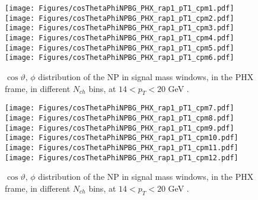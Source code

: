 \documentclass[12pt]{article}
\newcommand{\pt}{$p_{\mathrm{T}}$}
\begin{document}
%
%

\begin{figure}[htbp]
\centering
\texttt{[image: Figures/cosThetaPhiNPBG\_PHX\_rap1\_pT1\_cpm1.pdf]}
\texttt{[image: Figures/cosThetaPhiNPBG\_PHX\_rap1\_pT1\_cpm2.pdf]}
\texttt{[image: Figures/cosThetaPhiNPBG\_PHX\_rap1\_pT1\_cpm3.pdf]}
\texttt{[image: Figures/cosThetaPhiNPBG\_PHX\_rap1\_pT1\_cpm4.pdf]}
\texttt{[image: Figures/cosThetaPhiNPBG\_PHX\_rap1\_pT1\_cpm5.pdf]}
\texttt{[image: Figures/cosThetaPhiNPBG\_PHX\_rap1\_pT1\_cpm6.pdf]}
\caption{$\cos\vartheta,\,\phi$ distribution of the NP in signal mass windows, 
	in the PHX frame, in different $N_{ch}$ bins, at $14 < p_{T} < 20$ GeV .}
\end{figure}
\clearpage

\begin{figure}[htbp]
\centering
\texttt{[image: Figures/cosThetaPhiNPBG\_PHX\_rap1\_pT1\_cpm7.pdf]}
\texttt{[image: Figures/cosThetaPhiNPBG\_PHX\_rap1\_pT1\_cpm8.pdf]}
\texttt{[image: Figures/cosThetaPhiNPBG\_PHX\_rap1\_pT1\_cpm9.pdf]}
\texttt{[image: Figures/cosThetaPhiNPBG\_PHX\_rap1\_pT1\_cpm10.pdf]}
\texttt{[image: Figures/cosThetaPhiNPBG\_PHX\_rap1\_pT1\_cpm11.pdf]}
\texttt{[image: Figures/cosThetaPhiNPBG\_PHX\_rap1\_pT1\_cpm12.pdf]}
\caption{$\cos\vartheta,\,\phi$ distribution of the NP in signal mass windows, 
	in the PHX frame, in different $N_{ch}$ bins, at $14 < p_{T} < 20$ GeV .}
\end{figure}
\clearpage
\end{document}
